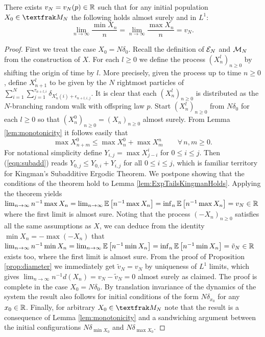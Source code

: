 \begin{proposition}\label{prop:ExpTailsSpeedExistence}
There exists $v_N = v_N(p) \in \R$ such that for any initial population $X_0 \in \frak{M}_N$ the following holds almost surely and in $L^1$:
\begin{equation}
\lim\limits_{n \to \infty} \frac{\min X_n}{n} = \lim\limits_{n \to \infty} \frac{\max X_n}{n} = v_N. 
\end{equation}
\end{proposition}

\begin{proof}
First we treat the case $X_0 = N \delta_0$. Recall the definition of $\cal{E}_N$ and $\cal{M}_N$ from the construction of $X$. For each $l \geq 0$ we define the process $(X^l_n)_{n \geq 0}$ by shifting the origin of time by $l$. More precisely, given the process up to time $n \geq 0$, define $X^l_{n+1}$ to be given by the $N$ rightmost particles of $\sum_{i = 1}^N \sum_{j=1}^{\tau_{n + l,i}} \delta_{X^l_n(i) + \epsilon_{n + l, i, j}}$. It is clear that each $(X^l_n)_{n \geq 0}$ is distributed as the $N$-branching random walk with offspring law $p$. Start $(X^l_n)_{n \geq 0}$ from $N \delta_0$ for each $l \geq 0$ so that $(X^0_n)_{n \geq 0} = (X_n)_{n \geq 0}$ almost surely. From Lemma \ref{lem:monotonicity} it follows easily that 
\begin{equation}\label{eqn:subadd}
\max X^0_{n + m} \leq \max X^0_n + \max X^n_m \qquad \forall\, n,m \geq 0. 
\end{equation}
For notational simplicity define $Y_{i,j} = \max X^i_{j - i}$ for $0 \leq i \leq j$. Then (\ref{eqn:subadd}) reads $Y_{0, j} \leq Y_{0,i} + Y_{i,j}$ for all $0 \leq i \leq j$, which is familiar territory for Kingman's Subadditive Ergodic Theorem. We postpone showing that the conditions of the theorem hold to Lemma \ref{lem:ExpTailsKingmanHolds}. Applying the theorem yields $\lim_{n \to \infty} n^{-1} \max X_n = \lim_{n \to \infty} \Ex{n^{-1} \max X_n} = \inf_n \Ex{n^{-1} \max X_n} = v_N \in \R$ where the first limit is almost sure. Noting that the process $(-X_n)_{n \geq 0}$ satisfies all the same assumptions as $X$, we can deduce from the identity $\min X_n = - \max (-X_n)$ that $\lim_{n \to \infty} n^{-1} \min X_n = \lim_{n \to \infty} \Ex{n^{-1} \min X_n} = \inf_n \Ex{n^{-1} \min X_n} = \tilde{v}_N \in \R$ exists too, where the first limit is almost sure. From the proof of Proposition \ref{prop:diameter} we immediately get $\tilde{v}_N = v_N$ by uniqueness of $L^1$ limits, which gives $\lim_{n\to\infty} n^{-1}d(X_n) = v_N - \tilde{v}_N = 0$ almost surely as claimed. The proof is complete in the case $X_0 = N \delta_0$. By translation invariance of the dynamics of the system the result also follows for initial conditions of the form $N \delta_{x_0}$ for any $x_0 \in \R$. Finally, for arbitrary $X_0 \in \frak{M}_N$ note that the result is a consequence of Lemma \ref{lem:monotonicity} and a sandwiching argument between the initial configurations $N \delta_{\min X_0}$ and $N \delta_{\max X_0}$. 
\end{proof}

